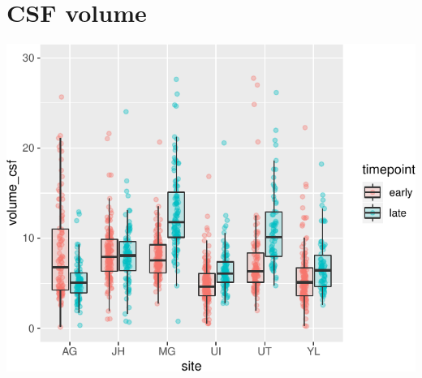 \documentclass[
]{article}
\begin{document}
\hypertarget{csf-volume}{%
\section{CSF volume}\label{csf-volume}}

\begin{center}\includegraphics{paper_files/figure-latex/plot_csf_both-1} \end{center}
\end{document}
